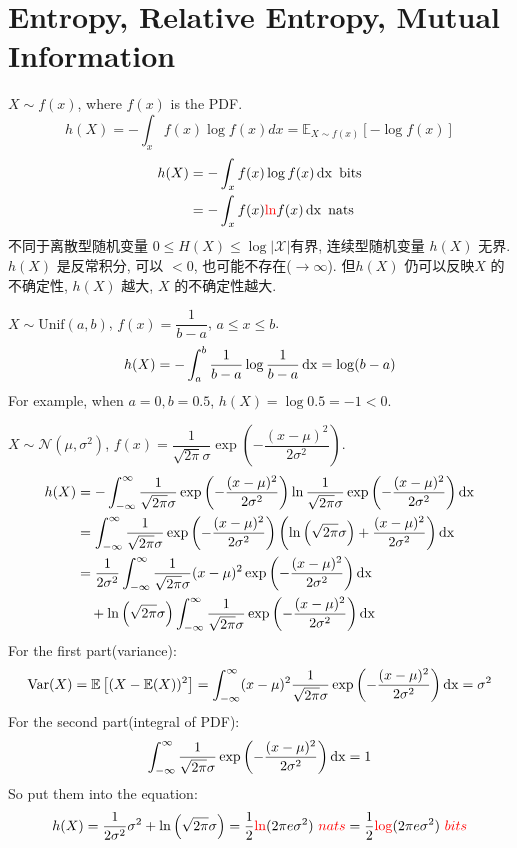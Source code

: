 \section{Entropy, Relative Entropy, Mutual Information}
$X\sim f(x)$, where $f(x)$ is the PDF.
$$h(X)=-\int_x f(x)\log f(x)dx=\mathbb{E}_{X\sim f(x)}\left[-\log f(x)\right]$$
\begin{align*}
h(X) & =-\int_x f(x)\log f(x) \operatorname{dx} \text{ bits} \\
&= -\int_x f(x)\textcolor{red}{\ln} f(x) \operatorname{dx} \text{ nats}
\end{align*}
不同于离散型随机变量 $0\leq H(X) \leq \log |\mathcal{X}|$有界, 连续型随机变量 $h(X)$ 无界. $h(X)$ 是反常积分, 可以 $<0$, 也可能不存在($\to \infty$). 但$h(X)$ 仍可以反映$X$ 的不确定性, $h(X)$ 越大, $X$ 的不确定性越大.

\begin{example}
$X\sim \text{Unif}(a, b)$, $f(x)=\dfrac{1}{b-a}$, $a\leq x\leq b$.
$$h(X)=-\int_a^b \dfrac{1}{b-a}\log \dfrac{1}{b-a} \operatorname{dx}=\log(b-a)$$
For example, when $a=0, b=0.5$, $h(X)=\log 0.5=-1<0$.
\end{example}

\begin{example}
$X\sim\mathcal{N}(\mu, \sigma^2)$, $f(x)=\dfrac{1}{\sqrt{2\pi}\sigma}\exp\left(-\dfrac{(x-\mu)^2}{2\sigma^2}\right)$.
\begin{align*}
h(X) &= -\int_{-\infty}^{\infty} \dfrac{1}{\sqrt{2\pi}\sigma}\exp\left(-\dfrac{(x-\mu)^2}{2\sigma^2}\right)\ln \dfrac{1}{\sqrt{2\pi}\sigma}\exp\left(-\dfrac{(x-\mu)^2}{2\sigma^2}\right) \operatorname{dx} \\
&= \int_{-\infty}^{\infty} \dfrac{1}{\sqrt{2\pi}\sigma}\exp\left(-\dfrac{(x-\mu)^2}{2\sigma^2}\right)\left( \ln\left(\sqrt{2\pi}\sigma\right) + \dfrac{(x-\mu)^2}{2\sigma^2}\right) \operatorname{dx} \\
&= \dfrac{1}{2\sigma^2}\int_{-\infty}^{\infty} \dfrac{1}{\sqrt{2\pi}\sigma}(x-\mu)^2\exp\left(-\dfrac{(x-\mu)^2}{2\sigma^2}\right) \operatorname{dx} \\
&\quad + \ln\left(\sqrt{2\pi}\sigma\right) \int_{-\infty}^{\infty} \dfrac{1}{\sqrt{2\pi}\sigma}\exp\left(-\dfrac{(x-\mu)^2}{2\sigma^2}\right) \operatorname{dx}
\end{align*}
For the first part(variance):
$$\operatorname{Var}(X)=\mathbb{E}\left[(X-\mathbb{E}(X))^2\right]=\int_{-\infty}^{\infty} (x-\mu)^2 \dfrac{1}{\sqrt{2\pi}\sigma}\exp\left(-\dfrac{(x-\mu)^2}{2\sigma^2}\right) \operatorname{dx}=\sigma^2$$
For the second part(integral of PDF):
$$\int_{-\infty}^{\infty} \dfrac{1}{\sqrt{2\pi}\sigma}\exp\left(-\dfrac{(x-\mu)^2}{2\sigma^2}\right) \operatorname{dx}=1$$
So put them into the equation:
$$h(X)=\dfrac{1}{2\sigma^2}\sigma^2 + \ln\left(\sqrt{2\pi}\sigma\right)=\dfrac{1}{2}\textcolor{red}{\ln}(2\pi e\sigma^2) \textcolor{red}{\ nats} =\dfrac{1}{2}\textcolor{red}{\log}(2\pi e\sigma^2) \textcolor{red}{\ bits} $$
\end{example}

